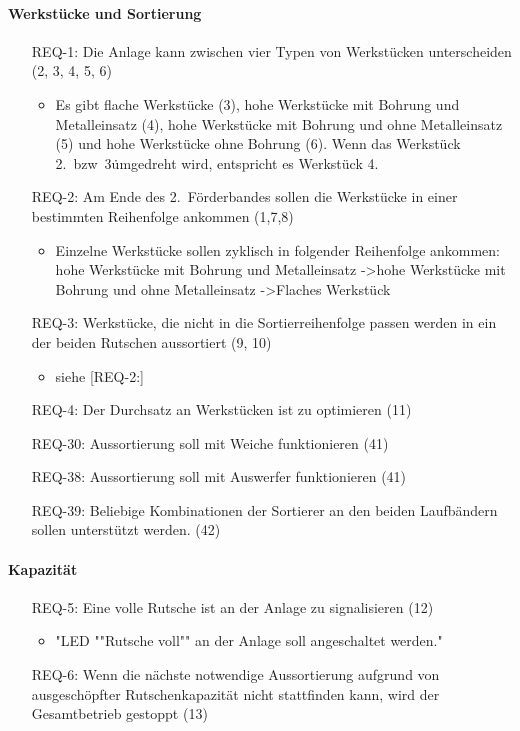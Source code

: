 \paragraph{Werkstücke und Sortierung}
\begin{itemize}
    \item[REQ-1:] Die Anlage kann zwischen vier Typen von Werkstücken unterscheiden (2, 3, 4, 5, 6)
    \begin{itemize}
        \item Es gibt flache Werkstücke (3), hohe Werkstücke mit Bohrung und Metalleinsatz (4), hohe Werkstücke
        mit Bohrung und ohne Metalleinsatz (5) und hohe Werkstücke ohne Bohrung (6).
        Wenn das Werkstück 2.\ bzw\  3\. umgedreht wird, entspricht es Werkstück 4.
    \end{itemize}
    \item[REQ-2:] Am Ende des 2.\ Förderbandes sollen die Werkstücke in einer bestimmten Reihenfolge ankommen (1,7,8)
    \begin{itemize}
        \item Einzelne Werkstücke sollen zyklisch in folgender Reihenfolge ankommen: hohe Werkstücke mit
        Bohrung und Metalleinsatz -\textgreater hohe Werkstücke mit Bohrung und ohne Metalleinsatz -\textgreater Flaches Werkstück
    \end{itemize}
    \item[REQ-3:] Werkstücke, die nicht in die Sortierreihenfolge passen werden in ein der beiden Rutschen aussortiert (9, 10)
    \begin{itemize}
        \item siehe [REQ-2:]
    \end{itemize}
    \item[REQ-4:] Der Durchsatz an Werkstücken ist zu optimieren (11)
    \item[REQ-30:] Aussortierung soll mit Weiche funktionieren (41)
    \item[REQ-38:] Aussortierung soll mit Auswerfer funktionieren (41)
    \item[REQ-39:] Beliebige Kombinationen der Sortierer an den beiden Laufbändern sollen unterstützt werden. (42)
\end{itemize}

\paragraph{Kapazität}
\begin{itemize}
    \item[REQ-5:] Eine volle Rutsche ist an der Anlage zu signalisieren (12)
    \begin{itemize}
        \item "LED ""Rutsche voll"" an der Anlage soll angeschaltet werden."
    \end{itemize}
    \item[REQ-6:] Wenn die nächste notwendige Aussortierung aufgrund von ausgeschöpfter Rutschenkapazität
    nicht stattfinden kann, wird der Gesamtbetrieb gestoppt (13)
\end{itemize}

